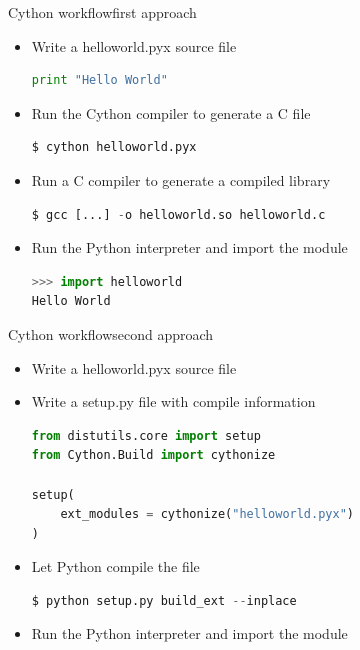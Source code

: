 \documentclass[dvipsnames]{beamer}
\begin{document}
\begin{frame}[fragile]{Cython workflow}{first approach}
\begin{itemize}
\item<1-> Write a helloworld.pyx source file
\begin{lstlisting}[language=Python]
print "Hello World"
\end{lstlisting}
\item<1-> Run the Cython compiler to generate a C file\\
\begin{lstlisting}[language=Python]
$ cython helloworld.pyx
\end{lstlisting}
\item<2-> Run a C compiler to generate a compiled library\\
\begin{lstlisting}[language=Python]
$ gcc [...] -o helloworld.so helloworld.c
\end{lstlisting}
\item<2-> Run the Python interpreter and import the module\\
\begin{lstlisting}[language=Python]
>>> import helloworld
Hello World
\end{lstlisting}
\end{itemize}
\end{frame}

\begin{frame}[fragile]{Cython workflow}{second approach}
\begin{itemize}
\item<1-> Write a helloworld.pyx source file
\item<1-> Write a setup.py file with compile information
\begin{lstlisting}[language=Python]
from distutils.core import setup
from Cython.Build import cythonize

setup(
    ext_modules = cythonize("helloworld.pyx")
)
\end{lstlisting}
\item<2-> Let Python compile the file
\begin{lstlisting}[language=Python]
$ python setup.py build_ext --inplace
\end{lstlisting}
\item<2-> Run the Python interpreter and import the module\\
\end{itemize}
\end{frame}
\end{document}
